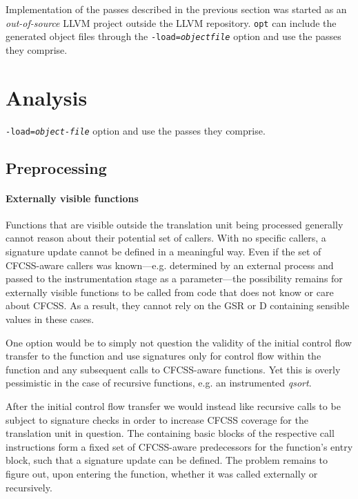 Implementation of the passes described in the previous section was started as
an \emph{out-of-source} LLVM
project outside the LLVM repository. \texttt{opt} can include the generated
object files through the \texttt{-load=\textit{objectfile}} option and use the
passes they comprise.

\section{Analysis}

\texttt{-load=\textit{object-file}} option and use the passes they comprise.

\subsection{Preprocessing}


\paragraph{Externally visible functions}

Functions that are visible outside the translation unit being processed
generally cannot reason about their potential set of callers. With no specific
callers, a signature update cannot be defined in a meaningful way. Even if the
set of CFCSS-aware callers was known—e.g. determined by an external
process and passed to the instrumentation stage as a parameter—the possibility
remains for externally visible functions to be called from code that does not
know or care about CFCSS. As a result, they cannot rely on the GSR or
D containing sensible values in these cases.

One option would be to simply not question the validity of the initial control
flow transfer to the function and use signatures only for control flow within
the function and any subsequent calls to CFCSS-aware functions. Yet this is
overly pessimistic in the case of recursive functions, e.g. an instrumented
\emph{qsort}.

After the initial control flow transfer we would instead like recursive calls
to be subject to signature checks in order to increase CFCSS coverage for the
translation unit in question. The containing basic blocks of the respective
call instructions form a fixed set of CFCSS-aware predecessors for the
function's entry block, such that a signature update can be defined. The
problem remains to figure out, upon entering the function, whether it was
called externally or recursively.

